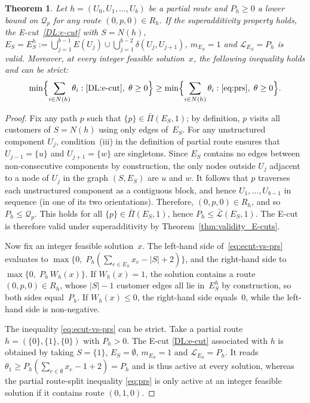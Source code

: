 \documentclass{article}
\newtheorem{theorem}{Theorem}
\begin{document}
{\begin{theorem}\label{thm:ecut-prs}
Let $h = (U_0, U_1, \ldots, U_b)$ be a partial route and $P_h \geq 0$ a lower bound on $\mathcal{Q}_p$ for any route $(0,p,0) \in R_h$. If the superadditivity property holds, the E-cut~\eqref{DL:e-cut} with $S = N(h)$, $E_S = E_S^h :=  \bigcup_{j=1}^{b-1} E(U_j) \cup \bigcup_{j=1}^{b-2} \delta(U_j, U_{j+1})$, $m_{E_S}=1$ and $\mathcal{L}_{E_S} = P_h$ is valid. Moreover, at every integer feasible solution~$x$, the following inequality holds and can be strict:
\begin{equation}\label{eq:ecut-vs-prs}
  \min\Bigl\{\sum_{i \in N(h)}\theta_i :
  \text{\eqref{DL:e-cut}},\; \theta \geq 0\Bigr\}
  \geq
  \min\Bigl\{\sum_{i \in N(h)}\theta_i :
  \text{\eqref{eq:prs}},\; \theta \geq 0\Bigr\}.
\end{equation}
\end{theorem}

\begin{proof}
Fix any path $p$ such that $\{p\} \in \bar{\Pi}(E_S, 1)$; by definition, $p$ visits all customers of $S = N(h)$ using only edges of~$E_S$. For any unstructured component $U_j$, condition~(iii) in the definition of partial route ensures that $U_{j-1} = \{u\}$ and $U_{j+1} = \{w\}$ are singletons. Since $E_S$ contains no edges between non-consecutive components by construction, the only nodes outside $U_j$ adjacent to a node of $U_j$ in the graph $(S, E_S)$ are $u$ and $w$. It follows that $p$ traverses each unstructured component as a contiguous block, and hence $U_1, \ldots, U_{b-1}$ in sequence (in one of its two orientations). Therefore, $(0,p,0) \in R_h$, and so $P_h \leq \mathcal{Q}_p$. This holds for all $\{p\} \in \bar{\Pi}(E_S, 1)$, hence $P_h \leq \bar{\mathcal{L}}(E_S, 1)$. The E-cut is therefore valid under superadditivity by Theorem~\ref{thm:validity_E-cuts}.

Now fix an integer feasible solution~$x$. The left-hand side of~\eqref{eq:ecut-vs-prs} evaluates to $\max\{0,\; P_h(\sum_{e \in E_S} x_e - |S| + 2)\}$, and the right-hand side to $\max\{0,\; P_h\, W_h(x)\}$. If $W_h(x) = 1$, the solution contains a route $(0,p,0) \in R_h$, whose $|S|-1$ customer edges all lie in~$E_S^h$ by construction, so both sides equal~$P_h$. If $W_h(x) \leq 0$, the right-hand side equals~$0$, while the left-hand side is non-negative.

The inequality \eqref{eq:ecut-vs-prs} can be strict. Take a partial route $h=(\{0\},\{1\},\{0\})$ with $P_h > 0$. The E-cut \eqref{DL:e-cut} associated with $h$ is obtained by taking $S=\{1\}$, $E_S= \emptyset$, $m_{E_S}=1$ and $\mathcal{L}_{E_S} = P_h$. It reads $\theta_1 \geq P_h(\sum_{e \in \emptyset} x_e - 1 + 2) = P_h$ and is thus active at every solution, whereas the partial route-split inequality \eqref{eq:prs} is only active at an integer feasible solution if it contains route $(0,1,0)$.
\end{proof}

}
\end{document}
